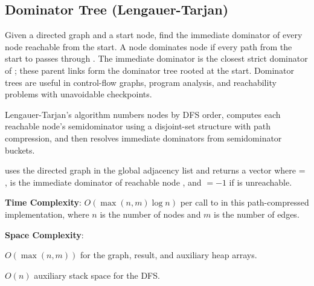 \subsection{Dominator Tree (Lengauer-Tarjan)}
\label{sec:4.2.4}
Given a directed graph and a start node, find the immediate dominator of every node reachable from the start. A node  dominates node  if every path from the start to  passes through . The immediate dominator  is the closest strict dominator of ; these parent links form the dominator tree rooted at the start. Dominator trees are useful in control-flow graphs, program analysis, and reachability problems with unavoidable checkpoints.

Lengauer-Tarjan's algorithm numbers nodes by DFS order, computes each reachable node's semidominator using a disjoint-set structure with path compression, and then resolves immediate dominators from semidominator buckets.

\begin{compactitem}
  \item {} uses the directed graph in the global adjacency list  and returns a vector  where  = ,  is the immediate dominator of reachable node , and  $= -1$ if  is unreachable.
\end{compactitem}

\textbf{Time Complexity}: $O(\max\left(n, m\right) \log n)$ per call to  in this path-compressed implementation, where $n$ is the number of nodes and $m$ is the number of edges.

\textbf{Space Complexity}:
\begin{compactitem}
  \item $O(\max\left(n, m\right))$ for the graph, result, and auxiliary heap arrays.
  \item $O(n)$ auxiliary stack space for the DFS.
\end{compactitem}

